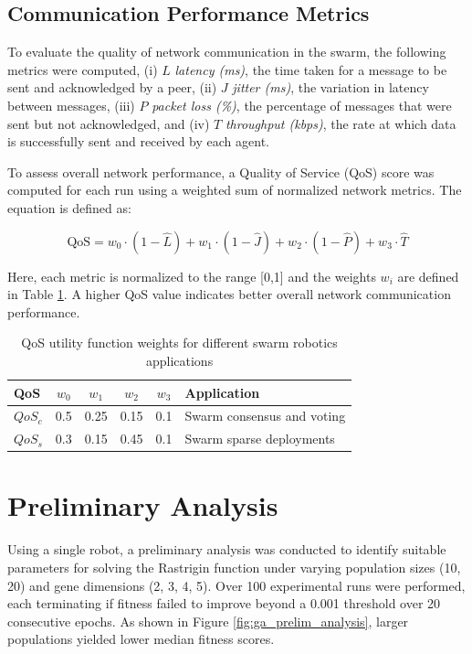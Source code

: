 \documentclass[conference]{IEEEtran}
\begin{document}
\subsection{Communication Performance Metrics}

To evaluate the quality of network communication in the swarm, the following metrics were computed, (i) $L$ \emph{latency (ms)}, the time taken for a message to be sent and acknowledged by a peer, (ii) $J$ \emph{jitter (ms)}, the variation in latency between messages, (iii) $P$ \emph{packet loss (\%)}, the percentage of messages that were sent but not acknowledged, and (iv) $T$ \emph{throughput (kbps)}, the rate at which data is successfully sent and received by each agent.

To assess overall network performance, a Quality of Service (QoS) score was computed for each run using a weighted sum of normalized network metrics. The equation is defined as:

\begin{equation}
\mathrm{QoS} = w_0 \cdot (1 - \hat{L}) + w_1 \cdot (1 - \hat{J}) + w_2 \cdot (1 - \hat{P}) + w_3 \cdot \hat{T}
\end{equation}

Here, each metric is normalized to the range [0,1] and the weights $w_i$ are defined in Table \ref{tab:qos}. A higher QoS value indicates better overall network communication performance.

\begin{table}[H]
\centering
\caption{QoS utility function weights for different swarm robotics applications}
\label{tab:qos}
  \begin{tabular}{@{} lcccc p{3.5cm} @{}}
  \toprule
  \textbf{QoS} & \textbf{$w_0$} & \textbf{$w_1$} & \textbf{$w_2$} & \textbf{$w_3$} & \textbf{Application} \\
  \midrule
  $QoS_c$      & 0.5 & 0.25   & 0.15   & 0.1     & Swarm consensus and voting     \\
  $QoS_s$      & 0.3 & 0.15   & 0.45   & 0.1     & Swarm sparse deployments       \\
  \bottomrule
  \end{tabular}
\end{table}

\section{Preliminary Analysis}

Using a single robot, a preliminary analysis was conducted to identify suitable parameters for solving the Rastrigin function under varying population sizes (10, 20) and gene dimensions (2, 3, 4, 5). Over 100 experimental runs were performed, each terminating if fitness failed to improve beyond a 0.001 threshold over 20 consecutive epochs. As shown in Figure \ref{fig:ga_prelim_analysis}, larger populations yielded lower median fitness scores.\\
\end{document}
